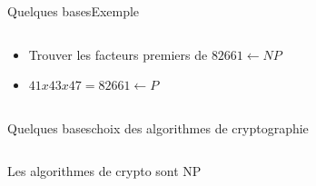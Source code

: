 \documentclass{beamer}
\begin{document}
\begin{frame}{Quelques bases}{Exemple}
  \begin{columns}
    \begin{column}{0.5\textwidth}
      \begin{itemize}
      \item Trouver les facteurs premiers de $82661 \leftarrow NP$
      \item $41x43x47 = 82661 \leftarrow P$
      \end{itemize}
    \end{column}
    
    \begin{column}{0.5\textwidth}
    \end{column}
  \end{columns}
\end{frame}

\begin{frame}{Quelques bases}{choix des algorithmes de cryptographie}
  \begin{columns}
    \begin{column}{0.5\textwidth}
      Les algorithmes de crypto sont NP
    \end{column}
    
    \begin{column}{0.5\textwidth}
    \end{column}
  \end{columns}
\end{frame}
\end{document}
